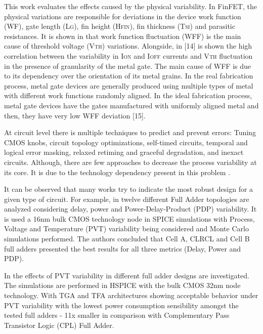 \documentclass[ecp,tc, english]{iiufrgs}
\begin{document}
This work evaluates the effects caused by the physical variability. In FinFET, the physical variations are responsible for deviations in the device work function (WF), gate length (L\textsc{g}), fin height (H\textsc{fin}), fin thickness (T\textsc{si}) and parasitic resistances. It is shown in \cite{meinhardt2014impact} that work 
function fluctuation (WFF) is the main cause of threshold voltage (V\textsc{th}) variations. Alongside, in [14] is shown the high correlation between the variability in I\textsc{on} and I\textsc{off} currents and V\textsc{th} fluctuation in the presence of granularity of the metal gate. The main cause of WFF is due to its dependency over the orientation of its metal grains. In the real fabrication process, metal gate devices are generally produced using multiple types of metal with different work functions randomly aligned. In the ideal fabrication process, metal gate devices have the gates manufactured with uniformly aligned metal and then, they have very low WFF deviation [15].

At circuit level there is multiple techniques to predict and prevent errors: Tuning CMOS knobs, circuit topology optimizations, self-timed circuits, temporal and logical error masking, relaxed retiming and graceful degradation, and inexact circuits. Although, there are few approaches to decrease the process variability at its core. It is due to the technology dependency present in this problem \cite{rahimi2016variability}.

It can be observed that many works try to indicate the most robust design for a given type of circuit. For example, in \cite{dokania2013investigation} twelve different Full Adder topologies are analyzed considering delay, power and Power-Delay-Product (PDP) variability. It is used a 16nm bulk CMOS technology node in SPICE simulations with Process, Voltage and Temperature (PVT) variability being considered and Monte Carlo simulations performed. The authors concluded that Cell A, CLRCL and Cell B full adders presented the best results for all three metrics (Delay, Power and PDP).

In \cite{ames2016investigating} the effects of PVT variability in different full adder designs are investigated. The simulations are performed in HSPICE with the bulk CMOS 32nm node technology. With TGA and TFA architectures showing acceptable behavior under PVT variability with the lowest power consumption sensibility amongst the tested full adders - 11x smaller in comparison with Complementary Pass Transistor Logic (CPL) Full Adder.
\end{document}
